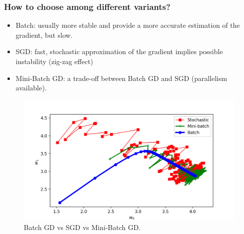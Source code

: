 \documentclass{beamer}
\begin{document}
	\begin{frame}
		\frametitle{How to choose among different variants?}
		\begin{itemize}
			\item Batch: usually more stable and provide a more accurate estimation of the gradient, but slow.
			\item SGD: fast, stochastic approximation of the gradient implies possible instability (zig-zag effect)
			\item Mini-Batch GD: a trade-off between Batch GD and SGD (parallelism available).
		\end{itemize}
		\begin{figure}
			\centering
			\includegraphics[scale=0.42]{images/gd_mb_sgd}
			\caption{Batch GD vs SGD vs Mini-Batch GD.}
		\end{figure}
	
	\end{frame}
\end{document}
